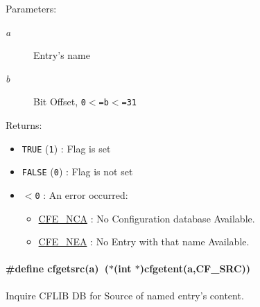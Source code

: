 \begin{Desc}
\item[Parameters:]
\begin{description}
\item[{\em a}]Entry's name \item[{\em b}]Bit Offset, {\tt 0$<$=b$<$=31} \end{description}
\end{Desc}
\begin{Desc}
\item[Returns:]\begin{itemize}
\item {\tt TRUE} ({\tt 1}) : Flag is set\item {\tt FALSE} ({\tt 0}) : Flag is not set\item {\tt $<$0} : An error occurred: \begin{itemize}
\item \hyperlink{group__errors_gf8cd36471ddcc549668f49238855609d}{CFE\_\-NCA} : No Configuration database Available.  \item \hyperlink{group__errors_g7f7e54a5ccefa34556fe6da3b35b4f27}{CFE\_\-NEA} : No Entry with that name Available.  \end{itemize}
\end{itemize}
\end{Desc}
\hypertarget{group__retrieval_gdf84eed41bdaa0a6cd8cd474c79d50b1}{
\paragraph[{cfgetsrc}]{\setlength{\rightskip}{0pt plus 5cm}\#define cfgetsrc(a)~($\ast$(int $\ast$)cfgetent(a,CF\_\-SRC))}\hfill}
\label{group__retrieval_gdf84eed41bdaa0a6cd8cd474c79d50b1}


Inquire CFLIB DB for Source of named entry's content. 

